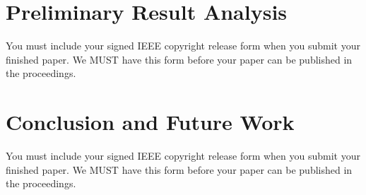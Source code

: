 \documentclass[10pt,twocolumn,letterpaper]{article}
\begin{document}
\section{Preliminary Result Analysis}

You must include your signed IEEE copyright release form when you submit
your finished paper. We MUST have this form before your paper can be
published in the proceedings.

\section{Conclusion and Future Work}

You must include your signed IEEE copyright release form when you submit
your finished paper. We MUST have this form before your paper can be
published in the proceedings.

{\small


}
\end{document}
